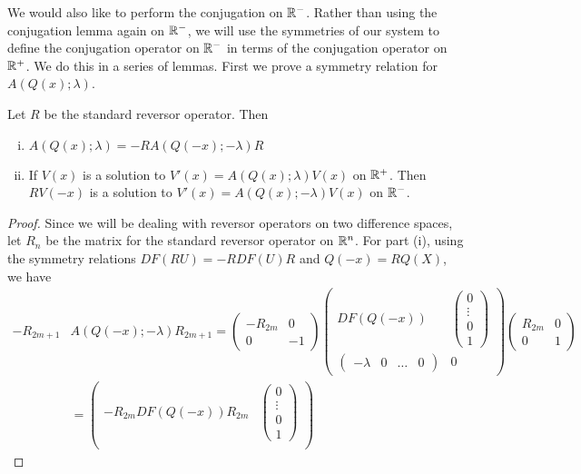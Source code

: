 \documentclass[thesis.tex]{subfiles}
\begin{document}
We would also like to perform the conjugation on $\mathbb{R}^-$. Rather than using the conjugation lemma again on $\mathbb{R}^-$, we will use the symmetries of our system to define the conjugation operator on $\mathbb{R}^-$ in terms of the conjugation operator on $\mathbb{R}^+$. We do this in a series of lemmas. First we prove a symmetry relation for $A(Q(x); \lambda)$.

\begin{lemma}\label{AQxsymmetrylemma}
Let $R$ be the standard reversor operator. Then
\begin{enumerate}[(i)]
\item $A(Q(x); \lambda) = -R A(Q(-x); -\lambda)R$
\item If $V(x)$ is a solution to $V'(x) = A(Q(x); \lambda) V(x)$ on $\mathbb{R}^+$. Then $R V(-x)$ is a solution to $V'(x) = A(Q(x); -\lambda) V(x)$ on $\mathbb{R}^-$.
\end{enumerate}
\begin{proof}
Since we will be dealing with reversor operators on two difference spaces, let $R_{n}$ be the matrix for the standard reversor operator on $\mathbb{R}^n$. For part (i), using the symmetry relations $DF(RU) = -RDF(U)R$ and $Q(-x) = RQ(X)$, we have
\begin{align*}
-R_{2m+1} &A(Q(-x); -\lambda) R_{2m+1}
= \begin{pmatrix}-R_{2m} & 0 \\ 0 & -1 \end{pmatrix} 
\begin{pmatrix}
DF(Q(-x)) & \begin{pmatrix} 0 \\ \vdots \\ 0 \\ 1 \end{pmatrix} \\
\begin{pmatrix} -\lambda & 0 & \dots & 0 \end{pmatrix} & 0
\end{pmatrix} \begin{pmatrix}R_{2m} & 0 \\ 0 & 1 \end{pmatrix} \\
&= \begin{pmatrix}
-R_{2m} DF(Q(-x)) R_{2m} & \begin{pmatrix} 0 \\ \vdots \\ 0 \\ 1 \end{pmatrix} \\

\end{pmatrix}
\end{align*}
\end{proof}
\end{lemma}
\end{document}
